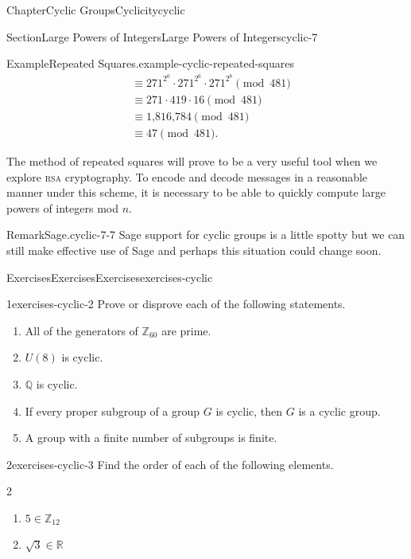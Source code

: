 \documentclass[oneside,10pt,]{book}
\newcommand{\acronym}[1]{\textsc{\MakeLowercase{#1}}}
\numberwithin{equation}{section}
\begin{document}
\begin{chapterptx}{Chapter}{Cyclic Groups}{}{Cyclicity}{}{}{cyclic}
\begin{sectionptx}{Section}{Large Powers of Integers}{}{Large Powers of Integers}{}{}{cyclic-7}
\begin{example}{Example}{Repeated Squares.}{example-cyclic-repeated-squares}
\begin{align*}
& \equiv 271^{ 2^0 } \cdot 271^{ 2^6 } \cdot 271^{ 2^8 } \pmod{ 481}\\
& \equiv 271 \cdot 419 \cdot 16 \pmod{ 481}\\
& \equiv \mbox{1,816,784} \pmod{ 481}\\
& \equiv 47 \pmod{ 481}\text{.}
\end{align*}
%
\end{example}
The method of repeated squares will prove to be a very useful tool when we explore  \acronym{RSA} cryptography. To encode and decode messages in a reasonable manner under this scheme, it is necessary to be able to quickly compute large powers of integers mod \(n\).%
\begin{remark}{Remark}{Sage.}{cyclic-7-7}%
Sage support for cyclic groups is a little spotty \textemdash{} but we can still make effective use of Sage and perhaps this situation could change soon.%
\end{remark}
\end{sectionptx}
%
%
\typeout{************************************************}
\typeout{************************************************}
%
\begin{exercises-section}{Exercises}{Exercises}{}{Exercises}{}{}{exercises-cyclic}
\begin{divisionexercise}{1}{}{}{exercises-cyclic-2}%
Prove or disprove each of the following statements.%
%
\begin{enumerate}[label={(\alph*)}]
\item{}All of the generators of \({\mathbb Z}_{60}\) are prime.%
\item{}\(U(8)\) is cyclic.%
\item{}\({\mathbb Q}\) is cyclic.%
\item{}If every proper subgroup of a group \(G\) is cyclic, then \(G\) is a cyclic group.%
\item{}A group with a finite number of subgroups is finite.%
\end{enumerate}
\end{divisionexercise}%
\begin{divisionexercise}{2}{}{}{exercises-cyclic-3}%
Find the order of each of the following elements.%
%
\begin{multicols}{2}
\begin{enumerate}[label={(\alph*)}]
\item{}\(\displaystyle 5 \in {\mathbb Z}_{12}\)%
\item{}\(\displaystyle \sqrt{3} \in {\mathbb R}\)%

\end{enumerate}
\end{multicols}
\end{divisionexercise}
\end{exercises-section}
\end{chapterptx}
\end{document}
